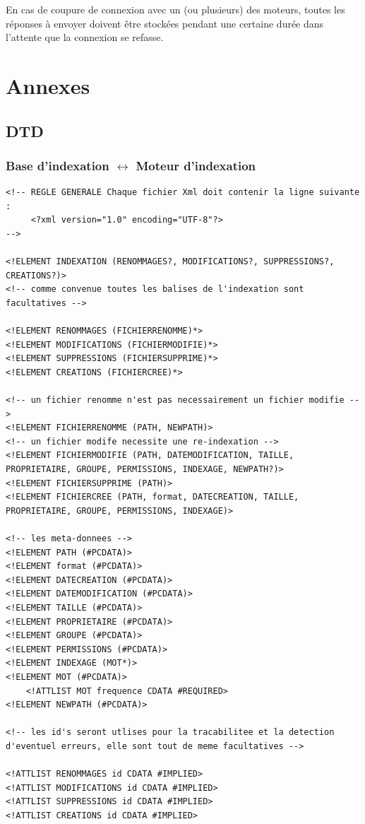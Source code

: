 \documentclass[a4paper,12pt]{report}
\begin{document}
En cas de coupure de connexion avec un (ou plusieurs) des moteurs, toutes les réponses à envoyer doivent être stockées pendant une certaine durée dans l'attente que la connexion se refasse.

\chapter{Annexes}

\section{DTD}\label{dtd}

\subsection{Base d'indexation $\leftrightarrow$ Moteur d'indexation}\label{dtd_bi_mi}
\begin{lstlisting}[frame=single]
<!-- REGLE GENERALE Chaque fichier Xml doit contenir la ligne suivante :
     <?xml version="1.0" encoding="UTF-8"?>
-->

<!ELEMENT INDEXATION (RENOMMAGES?, MODIFICATIONS?, SUPPRESSIONS?, CREATIONS?)>
<!-- comme convenue toutes les balises de l'indexation sont facultatives -->

<!ELEMENT RENOMMAGES (FICHIERRENOMME)*>
<!ELEMENT MODIFICATIONS (FICHIERMODIFIE)*>
<!ELEMENT SUPPRESSIONS (FICHIERSUPPRIME)*>
<!ELEMENT CREATIONS (FICHIERCREE)*>

<!-- un fichier renomme n'est pas necessairement un fichier modifie -->
<!ELEMENT FICHIERRENOMME (PATH, NEWPATH)>
<!-- un fichier modife necessite une re-indexation -->
<!ELEMENT FICHIERMODIFIE (PATH, DATEMODIFICATION, TAILLE, PROPRIETAIRE, GROUPE, PERMISSIONS, INDEXAGE, NEWPATH?)>
<!ELEMENT FICHIERSUPPRIME (PATH)>
<!ELEMENT FICHIERCREE (PATH, format, DATECREATION, TAILLE, PROPRIETAIRE, GROUPE, PERMISSIONS, INDEXAGE)>

<!-- les meta-donnees -->
<!ELEMENT PATH (#PCDATA)>
<!ELEMENT format (#PCDATA)>
<!ELEMENT DATECREATION (#PCDATA)>
<!ELEMENT DATEMODIFICATION (#PCDATA)>
<!ELEMENT TAILLE (#PCDATA)>
<!ELEMENT PROPRIETAIRE (#PCDATA)>
<!ELEMENT GROUPE (#PCDATA)>
<!ELEMENT PERMISSIONS (#PCDATA)>
<!ELEMENT INDEXAGE (MOT*)>
<!ELEMENT MOT (#PCDATA)>
	<!ATTLIST MOT frequence CDATA #REQUIRED>
<!ELEMENT NEWPATH (#PCDATA)>

<!-- les id's seront utlises pour la tracabilitee et la detection d'eventuel erreurs, elle sont tout de meme facultatives -->

<!ATTLIST RENOMMAGES id CDATA #IMPLIED>
<!ATTLIST MODIFICATIONS id CDATA #IMPLIED>
<!ATTLIST SUPPRESSIONS id CDATA #IMPLIED>
<!ATTLIST CREATIONS id CDATA #IMPLIED>
\end{lstlisting}
\end{document}
